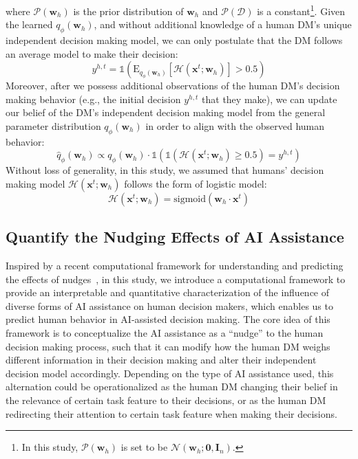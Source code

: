 \documentclass[letterpaper]{article} %
\begin{document}
\noindent where $\mathcal{P}(\bm{w}_h)$ is the prior distribution of $\bm{w}_h$ and  $\mathcal{P}(\mathcal{D})$ is a constant\footnote{In this study, $\mathcal{P}(\bm{w}_h)$ is set to be  $\mathcal{N}(\bm{w}_h; \bm{0},\bm{I}_n)$.}.
Given the learned $q_{\phi}(\bm{w}_h)$, and without additional knowledge of a human DM's unique independent decision making model, we can only postulate that the DM  follows an average model to make their decision:
\begin{equation}
   y^{h,t} =  \mathds{1}(\mathrm{E}_{q_{\phi}(\bm{w}_h)} [ \mathcal{H}(\bm{x}^t;\bm{w}_h)]>0.5)
   \label{average_prediction}
\end{equation}
Moreover, after we possess additional observations of the human DM's decision making behavior (e.g., the initial decision $y^{h,t}$ that they make), we can update our belief of the DM's independent decision making model from  the general parameter distribution $q_{\phi}(\bm{w}_h)$ in order to
align with the observed human behavior:
\begin{equation}
\hat{q}_{\phi}(\bm{w}_h) \propto q_{\phi}(\bm{w}_h) \cdot \mathds{1}(\mathds{1}( \mathcal{H}(\bm{x}^t;\bm{w}_h) \geq 0.5 )  = y^{h,t})
\label{sample}
\end{equation}
Without loss of generality, in this study,
we assumed that humans' decision making model $\mathcal{H}(\bm{x}^t;\bm{w}_h)$ follows the form of logistic model:
\begin{equation}
    \mathcal{H}(\bm{x}^t;\bm{w}_h) = \text{sigmoid}(\bm{w}_h \cdot \bm{x}^t)
\end{equation}

\subsection{Quantify the Nudging Effects of AI Assistance}
Inspired by a recent computational framework for understanding and predicting the effects of nudges~\cite{callaway2022optimal},
in this study, we introduce a computational framework
to provide an interpretable and quantitative characterization of the influence of diverse forms of AI assistance on human decision makers, which enables us to predict human behavior in AI-assisted decision making.
The core idea of this framework is to conceptualize the AI assistance as a ``nudge'' to the human decision making
process,
such that it can modify how the human DM weighs different information in their decision making and alter their independent decision model accordingly. Depending on the type of AI assistance used, this alternation could be operationalized as the human DM changing their belief in the relevance of certain task feature to their decisions, or as the human DM redirecting their attention to certain task feature when making their decisions.
\end{document}
